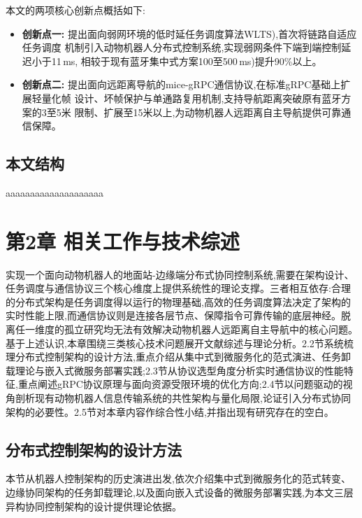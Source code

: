 本文的两项核心创新点概括如下:
 
\begin{itemize}[leftmargin=2em]
 
  \item \textbf{创新点一:}
  提出面向弱网环境的低时延任务调度算法WLTS),首次将链路自适应任务调度
  机制引入动物机器人分布式控制系统,实现弱网条件下端到端控制延迟小于11\,ms,
  相较于现有蓝牙集中式方案100至500\,ms)提升90\%以上。
 
  \item \textbf{创新点二:}
  提出面向远距离导航的mice-gRPC通信协议,在标准gRPC基础上扩展轻量化帧
  设计、坏帧保护与单通路复用机制,支持导航距离突破原有蓝牙方案的3至5米
  限制、扩展至15米以上,为动物机器人远距离自主导航提供可靠通信保障。
 
\end{itemize}
\section{本文结构}

aaaaaaaaaaaaaaaaaaaa


\chapter{第2章 相关工作与技术综述}
实现一个面向动物机器人的地面站-边缘端分布式协同控制系统,需要在架构设计、任务调度与通信协议三个核心维度上提供系统性的理论支撑。三者相互依存:合理的分布式架构是任务调度得以运行的物理基础,高效的任务调度算法决定了架构的实时性能上限,而通信协议则是连接各层节点、保障指令可靠传输的底层神经。脱离任一维度的孤立研究均无法有效解决动物机器人远距离自主导航中的核心问题。
基于上述认识,本章围绕三类核心技术问题展开文献综述与理论分析。2.2节系统梳理分布式控制架构的设计方法,重点介绍从集中式到微服务化的范式演进、任务卸载理论与嵌入式微服务部署实践;2.3节从协议选型角度分析实时通信协议的性能特征,重点阐述gRPC协议原理与面向资源受限环境的优化方向;2.4节以问题驱动的视角剖析现有动物机器人信息传输系统的共性架构与量化局限,论证引入分布式协同架构的必要性。2.5节对本章内容作综合性小结,并指出现有研究存在的空白。

\section{分布式控制架构的设计方法}
本节从机器人控制架构的历史演进出发,依次介绍集中式到微服务化的范式转变、边缘协同架构的任务卸载理论,以及面向嵌入式设备的微服务部署实践,为本文三层异构协同控制架构的设计提供理论依据。

